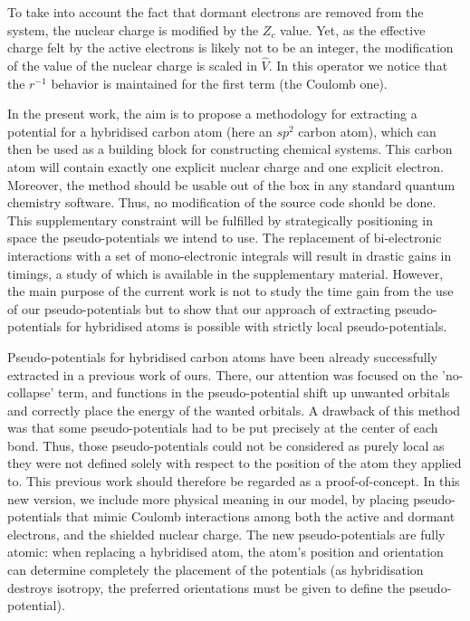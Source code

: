 \documentclass[aip]{revtex4-1}
\begin{document}
To take into account the fact that dormant electrons are removed from the
system, the nuclear charge is modified by the $Z_c$ value.
Yet, as the effective charge felt by the active electrons is likely not to be an integer,
the modification of the value of the nuclear charge is scaled in $\hat{V}$.
In this operator we notice that the \(r^{-1}\) behavior is maintained for the first term 
(the Coulomb one).

In the present work, the aim is 
to propose a methodology for extracting a potential for
a hybridised carbon atom (here an $sp^2$ carbon atom), which can then be
used as a building block for constructing chemical systems. This carbon atom
will contain exactly one explicit nuclear charge and one explicit electron.
Moreover, the method should be usable 
out of the box in any standard quantum chemistry software.
Thus, no modification of the source code should be done.
This supplementary constraint will be fulfilled by strategically positioning in space the pseudo-potentials
we intend to use. 
The replacement of bi-electronic interactions with a set of mono-electronic integrals
will result in drastic gains in timings, a study of which is available in the supplementary material.
However, the main purpose of the current work is not to study the time gain from the use of our pseudo-potentials but to show that our approach of extracting pseudo-potentials
for hybridised atoms is possible with strictly local pseudo-potentials.

Pseudo-potentials for hybridised carbon
atoms have been already successfully extracted in a previous work of ours.\cite{drujon_pseudopotentials_2013}
There, our attention was focused on the 'no-collapse' term, and 
functions in the pseudo-potential shift up unwanted orbitals and correctly place the energy of the
wanted orbitals.
A drawback of this method was that some pseudo-potentials had to be put precisely at the center
of each bond.
Thus, those pseudo-potentials could not be considered as purely local as they were not defined solely
with respect to the position of the atom they applied to.
This previous work should therefore be regarded as a proof-of-concept.
In this new version, we include more physical meaning in our model, 
by placing pseudo-potentials that mimic Coulomb interactions among both the active and dormant electrons, and the shielded nuclear charge. 
The new pseudo-potentials are fully atomic: when replacing a hybridised atom, the atom's position and orientation can determine completely the placement of the potentials (as hybridisation destroys isotropy, the preferred orientations
must be given to define the pseudo-potential).
\end{document}
